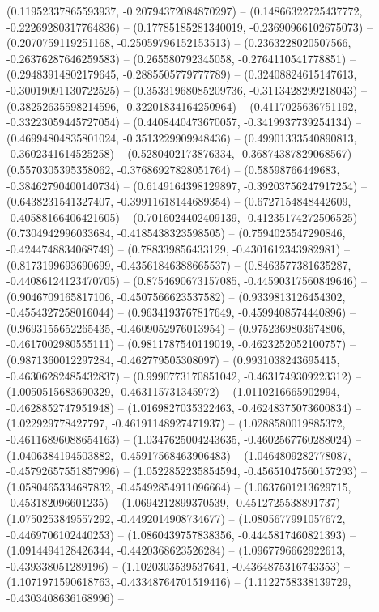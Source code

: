 \begin{scope}[blend group = overlay]
(0.11952337865593937, -0.20794372084870297) -- 
(0.14866322725437772, -0.22269280317764836) -- 
(0.17785185281340019, -0.23690966102675073) -- 
(0.2070759119251168, -0.25059796152153513) -- 
(0.2363228020507566, -0.26376287646259583) -- 
(0.265580792345058, -0.2764110541778851) -- 
(0.29483914802179645, -0.2885505779777789) -- 
(0.32408824615147613, -0.30019091130722525) -- 
(0.35331968085209736, -0.3113428299218043) -- 
(0.38252635598214596, -0.32201834164250964) -- 
(0.4117025636751192, -0.33223059445727054) -- 
(0.4408440473670057, -0.3419937739254134) -- 
(0.46994804835801024, -0.3513229909948436) -- 
(0.49901333540890813, -0.3602341614525258) -- 
(0.5280402173876334, -0.36874387829068567) -- 
(0.5570305395358062, -0.37686927828051764) -- 
(0.58598766449683, -0.38462790400140734) -- 
(0.6149164398129897, -0.39203756247917254) -- 
(0.6438231541327407, -0.39911618144689354) -- 
(0.6727154848442609, -0.40588166406421605) -- 
(0.7016024402409139, -0.41235174272506525) -- 
(0.7304942996033684, -0.4185438323598505) -- 
(0.7594025547290846, -0.4244748834068749) -- 
(0.788339856433129, -0.4301612343982981) -- 
(0.8173199693690699, -0.43561846388665537) -- 
(0.8463577381635287, -0.44086124123470705) -- 
(0.8754690673157085, -0.44590317560849646) -- 
(0.9046709165817106, -0.4507566623537582) -- 
(0.9339813126454302, -0.4554327258016044) -- 
(0.9634193767817649, -0.4599408574440896) -- 
(0.9693155652265435, -0.4609052976013954) -- 
(0.9752369803674806, -0.4617002980555111) -- 
(0.9811787540119019, -0.4623252052100757) -- 
(0.9871360012297284, -0.462779505308097) -- 
(0.9931038243695415, -0.46306282485432837) -- 
(0.9990773170851042, -0.4631749309223312) -- 
(1.0050515683690329, -0.463115731345972) -- 
(1.0110216665902994, -0.4628852747951948) -- 
(1.0169827035322463, -0.46248375073600834) -- 
(1.022929778427797, -0.46191148927471937) -- 
(1.0288580019885372, -0.46116896088654163) -- 
(1.0347625004243635, -0.4602567760288024) -- 
(1.0406384194503882, -0.45917568463906483) -- 
(1.0464809282778087, -0.45792657551857996) -- 
(1.0522852235854594, -0.45651047560157293) -- 
(1.0580465334687832, -0.45492854911096664) -- 
(1.0637601213629715, -0.453182096601235) -- 
(1.0694212899370539, -0.4512725538891737) -- 
(1.0750253849557292, -0.4492014908734677) -- 
(1.0805677991057672, -0.4469706102440253) -- 
(1.0860439757838356, -0.4445817460821393) -- 
(1.0914494128426344, -0.4420368623526284) -- 
(1.0967796662922613, -0.439338051289196) -- 
(1.1020303539537641, -0.4364875316743353) -- 
(1.1071971590618763, -0.43348764701519416) -- 
(1.1122758338139729, -0.4303408636168996) -- 

\end{scope}
